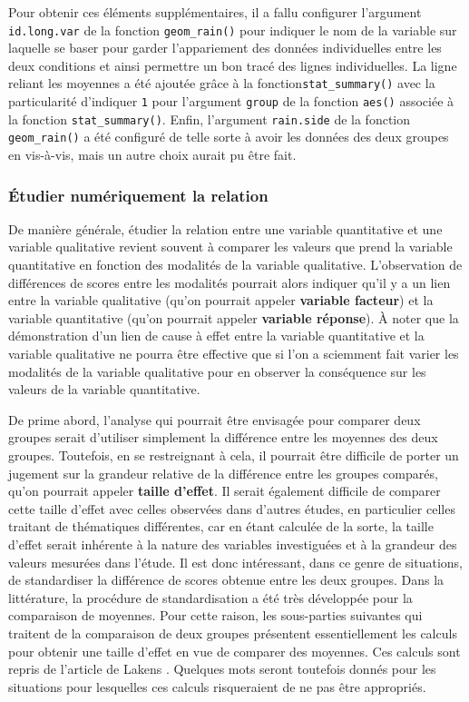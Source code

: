\documentclass[
]{book}
\begin{document}
Pour obtenir ces éléments supplémentaires, il a fallu configurer l'argument \texttt{id.long.var} de la fonction \texttt{geom\_rain()} pour indiquer le nom de la variable sur laquelle se baser pour garder l'appariement des données individuelles entre les deux conditions et ainsi permettre un bon tracé des lignes individuelles. La ligne reliant les moyennes a été ajoutée grâce à la fonction\texttt{stat\_summary()} avec la particularité d'indiquer \texttt{1} pour l'argument \texttt{group} de la fonction \texttt{aes()} associée à la fonction \texttt{stat\_summary()}. Enfin, l'argument \texttt{rain.side} de la fonction \texttt{geom\_rain()} a été configuré de telle sorte à avoir les données des deux groupes en vis-à-vis, mais un autre choix aurait pu être fait.

\hypertarget{uxe9tudier-numuxe9riquement-la-relation-2}{%
\subsubsection{Étudier numériquement la relation}\label{uxe9tudier-numuxe9riquement-la-relation-2}}

De manière générale, étudier la relation entre une variable quantitative et une variable qualitative revient souvent à comparer les valeurs que prend la variable quantitative en fonction des modalités de la variable qualitative. L'observation de différences de scores entre les modalités pourrait alors indiquer qu'il y a un lien entre la variable qualitative (qu'on pourrait appeler \textbf{variable facteur}) et la variable quantitative (qu'on pourrait appeler \textbf{variable réponse}). À noter que la démonstration d'un lien de cause à effet entre la variable quantitative et la variable qualitative ne pourra être effective que si l'on a sciemment fait varier les modalités de la variable qualitative pour en observer la conséquence sur les valeurs de la variable quantitative.

De prime abord, l'analyse qui pourrait être envisagée pour comparer deux groupes serait d'utiliser simplement la différence entre les moyennes des deux groupes. Toutefois, en se restreignant à cela, il pourrait être difficile de porter un jugement sur la grandeur relative de la différence entre les groupes comparés, qu'on pourrait appeler \textbf{taille d'effet}. Il serait également difficile de comparer cette taille d'effet avec celles observées dans d'autres études, en particulier celles traitant de thématiques différentes, car en étant calculée de la sorte, la taille d'effet serait inhérente à la nature des variables investiguées et à la grandeur des valeurs mesurées dans l'étude. Il est donc intéressant, dans ce genre de situations, de standardiser la différence de scores obtenue entre les deux groupes. Dans la littérature, la procédure de standardisation a été très développée pour la comparaison de moyennes. Pour cette raison, les sous-parties suivantes qui traitent de la comparaison de deux groupes présentent essentiellement les calculs pour obtenir une taille d'effet en vue de comparer des moyennes. Ces calculs sont repris de l'article de Lakens \autocite*{lakensCalculatingReportingEffect2013}. Quelques mots seront toutefois donnés pour les situations pour lesquelles ces calculs risqueraient de ne pas être appropriés.
\end{document}
